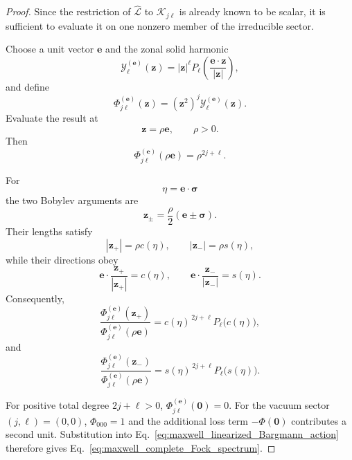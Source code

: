 \documentclass[11pt,oneside]{article}
\numberwithin{equation}{section}
\theoremstyle{definition}
\begin{document}
\begin{proof}
Since the restriction of
$\widehat{\mathcal L}$ to $\mathscr K_{j\ell}$ is already known to be
scalar, it is sufficient to evaluate it on one nonzero member of the
irreducible sector.

Choose a unit vector $\bm e$ and the zonal solid harmonic
\begin{equation}
\mathcal Y_\ell^{(\bm e)}(\bm z)
=
|\bm z|^\ell
P_\ell
\left(
\frac{\bm e\cdot\bm z}{|\bm z|}
\right),
\end{equation}
and define
\begin{equation}
\Phi_{j\ell}^{(\bm e)}(\bm z)
=
(\bm z^2)^j
\mathcal Y_\ell^{(\bm e)}(\bm z).
\end{equation}
Evaluate the result at
\begin{equation}
\bm z=\rho\bm e,
\qquad
\rho>0.
\end{equation}
Then
\begin{equation}
\Phi_{j\ell}^{(\bm e)}(\rho\bm e)
=
\rho^{2j+\ell}.
\end{equation}

For
\begin{equation}
\eta=\bm e\cdot\bm\sigma
\end{equation}
the two Bobylev arguments are
\begin{equation}
\bm z_\pm
=
\frac{\rho}{2}
(\bm e\pm\bm\sigma).
\end{equation}
Their lengths satisfy
\begin{equation}
|\bm z_+|
=
\rho c(\eta),
\qquad
|\bm z_-|
=
\rho s(\eta),
\end{equation}
while their directions obey
\begin{equation}
\bm e\cdot\frac{\bm z_+}{|\bm z_+|}
=
c(\eta),
\qquad
\bm e\cdot\frac{\bm z_-}{|\bm z_-|}
=
s(\eta).
\end{equation}
Consequently,
\begin{equation}
\frac{
\Phi_{j\ell}^{(\bm e)}(\bm z_+)
}{
\Phi_{j\ell}^{(\bm e)}(\rho\bm e)
}
=
c(\eta)^{\,2j+\ell}
P_\ell\!\bigl(c(\eta)\bigr),
\end{equation}
and
\begin{equation}
\frac{
\Phi_{j\ell}^{(\bm e)}(\bm z_-)
}{
\Phi_{j\ell}^{(\bm e)}(\rho\bm e)
}
=
s(\eta)^{\,2j+\ell}
P_\ell\!\bigl(s(\eta)\bigr).
\end{equation}

For positive total degree $2j+\ell>0$,
$\Phi_{j\ell}^{(\bm e)}(\bm0)=0$.
For the vacuum sector $(j,\ell)=(0,0)$,
$\Phi_{000}=1$ and the additional loss term
$-\Phi(\bm0)$ contributes a second unit.  Substitution into
Eq.~\eqref{eq:maxwell_linearized_Bargmann_action} therefore gives
Eq.~\eqref{eq:maxwell_complete_Fock_spectrum}.
\end{proof}
\end{document}
